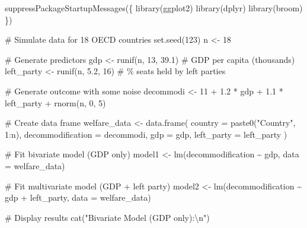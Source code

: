 \documentclass[
  letterpaper,
  DIV=11,
  numbers=noendperiod]{scrreprt}
\newenvironment{Shaded}{\begin{snugshade}}{\end{snugshade}}
\newcommand{\AttributeTok}[1]{\textcolor[rgb]{0.40,0.45,0.13}{#1}}
\newcommand{\CommentTok}[1]{\textcolor[rgb]{0.37,0.37,0.37}{#1}}
\newcommand{\DecValTok}[1]{\textcolor[rgb]{0.68,0.00,0.00}{#1}}
\newcommand{\FloatTok}[1]{\textcolor[rgb]{0.68,0.00,0.00}{#1}}
\newcommand{\FunctionTok}[1]{\textcolor[rgb]{0.28,0.35,0.67}{#1}}
\newcommand{\NormalTok}[1]{\textcolor[rgb]{0.00,0.23,0.31}{#1}}
\newcommand{\OtherTok}[1]{\textcolor[rgb]{0.00,0.23,0.31}{#1}}
\newcommand{\SpecialCharTok}[1]{\textcolor[rgb]{0.37,0.37,0.37}{#1}}
\newcommand{\StringTok}[1]{\textcolor[rgb]{0.13,0.47,0.30}{#1}}
\begin{document}
\begin{Shaded}
\begin{Highlighting}[]
\FunctionTok{suppressPackageStartupMessages}\NormalTok{(\{}
  \FunctionTok{library}\NormalTok{(ggplot2)}
  \FunctionTok{library}\NormalTok{(dplyr)}
  \FunctionTok{library}\NormalTok{(broom)}
\NormalTok{\})}

\CommentTok{\# Simulate data for 18 OECD countries}
\FunctionTok{set.seed}\NormalTok{(}\DecValTok{123}\NormalTok{)}
\NormalTok{n }\OtherTok{\textless{}{-}} \DecValTok{18}

\CommentTok{\# Generate predictors}
\NormalTok{gdp }\OtherTok{\textless{}{-}} \FunctionTok{runif}\NormalTok{(n, }\DecValTok{13}\NormalTok{, }\FloatTok{39.1}\NormalTok{)           }\CommentTok{\# GDP per capita (thousands)}
\NormalTok{left\_party }\OtherTok{\textless{}{-}} \FunctionTok{runif}\NormalTok{(n, }\FloatTok{5.2}\NormalTok{, }\DecValTok{16}\NormalTok{)     }\CommentTok{\# \% seats held by left parties}

\CommentTok{\# Generate outcome with some noise}
\NormalTok{decommodi }\OtherTok{\textless{}{-}} \DecValTok{11} \SpecialCharTok{+} \FloatTok{1.2} \SpecialCharTok{*}\NormalTok{ gdp }\SpecialCharTok{+} \FloatTok{1.1} \SpecialCharTok{*}\NormalTok{ left\_party }\SpecialCharTok{+} \FunctionTok{rnorm}\NormalTok{(n, }\DecValTok{0}\NormalTok{, }\DecValTok{5}\NormalTok{)}

\CommentTok{\# Create data frame}
\NormalTok{welfare\_data }\OtherTok{\textless{}{-}} \FunctionTok{data.frame}\NormalTok{(}
  \AttributeTok{country =} \FunctionTok{paste0}\NormalTok{(}\StringTok{"Country"}\NormalTok{, }\DecValTok{1}\SpecialCharTok{:}\NormalTok{n),}
  \AttributeTok{decommodification =}\NormalTok{ decommodi,}
  \AttributeTok{gdp =}\NormalTok{ gdp,}
  \AttributeTok{left\_party =}\NormalTok{ left\_party}
\NormalTok{)}

\CommentTok{\# Fit bivariate model (GDP only)}
\NormalTok{model1 }\OtherTok{\textless{}{-}} \FunctionTok{lm}\NormalTok{(decommodification }\SpecialCharTok{\textasciitilde{}}\NormalTok{ gdp, }\AttributeTok{data =}\NormalTok{ welfare\_data)}

\CommentTok{\# Fit multivariate model (GDP + left party)}
\NormalTok{model2 }\OtherTok{\textless{}{-}} \FunctionTok{lm}\NormalTok{(decommodification }\SpecialCharTok{\textasciitilde{}}\NormalTok{ gdp }\SpecialCharTok{+}\NormalTok{ left\_party, }\AttributeTok{data =}\NormalTok{ welfare\_data)}

\CommentTok{\# Display results}
\FunctionTok{cat}\NormalTok{(}\StringTok{"Bivariate Model (GDP only):}\SpecialCharTok{\textbackslash{}n}\StringTok{"}\NormalTok{)}
\end{Highlighting}
\end{Shaded}
\end{document}
